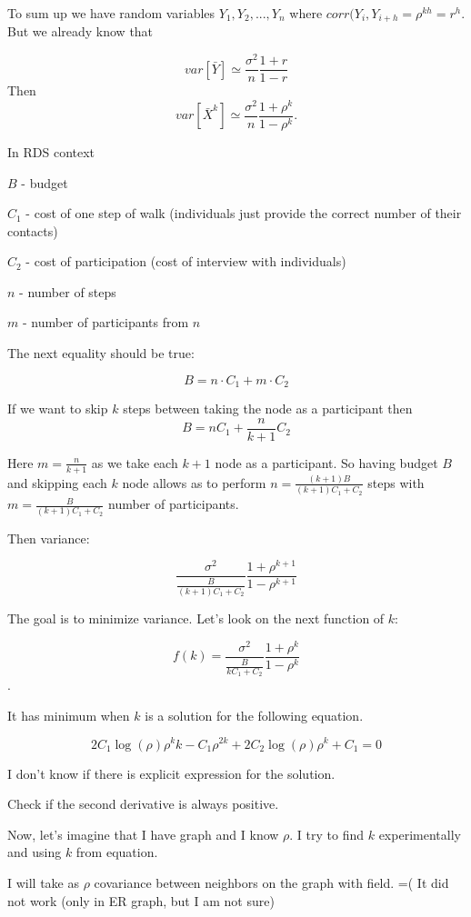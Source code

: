 \documentclass[12pt]{report}
\begin{document}
To sum up we have random variables $Y_1, Y_2, ..., Y_n$ where $corr(Y_i, Y_{i+h} = \rho^{kh} = r^h$. But we already know that 

$$var\left[\bar{Y} \right] \simeq  \frac{\sigma^2}{n} \frac{1+r}{1-r}$$
Then
$$var\left[\bar{X}^k \right] \simeq  \frac{\sigma^2}{n} \frac{1+\rho^k}{1-\rho^k}.$$


In RDS context

$B$ - budget

$C_1$ - cost of one step of walk (individuals just provide the correct number of their contacts)

$C_2$ - cost of participation (cost of interview with individuals)

$n$ - number of steps

$m$ - number of participants from $n$

The next equality should be true:

$$B = n \cdot C_1 + m \cdot C_2$$

If we want to skip $k$ steps between taking the node as a participant then
$$B = nC_1 + \frac{n}{k+1}C_2$$

Here $m = \frac{n}{k+1}$ as we take each $k+1$ node as a participant. So having budget $B$ and skipping each $k$ node allows as to perform $n = \frac{(k+1)B}{(k+1)C_1 + C_2}$ steps with $m = \frac{B}{(k+1)C_1 + C_2}$ number of participants.

Then variance:

$$\frac{\sigma^2}{\frac{B}{(k+1)C_1 + C_2}} \frac{1+\rho^{k+1}}{1-\rho^{k+1}}$$ 

The goal is to minimize variance. Let's look on the next function of $k$:

$$ f(k) = \frac{\sigma^2}{\frac{B}{kC_1 + C_2}} \frac{1+\rho^{k}}{1-\rho^{k}}$$.

It has minimum when $k$ is a solution for the following equation.

$$ 2C_1 \log(\rho) \rho^kk - C_1\rho^{2k} + 2C_2 \log(\rho) \rho^k + C_1 = 0$$

I don't know if there is explicit expression for the solution.


Check if the second derivative is always positive.

Now, let's imagine that I have graph and I know $\rho$. I try to find $k$ experimentally and using $k$ from equation.

I will take as $\rho$ covariance between neighbors on the graph with field.
=(  It did not work (only in ER graph, but I am not sure)
\end{document}
